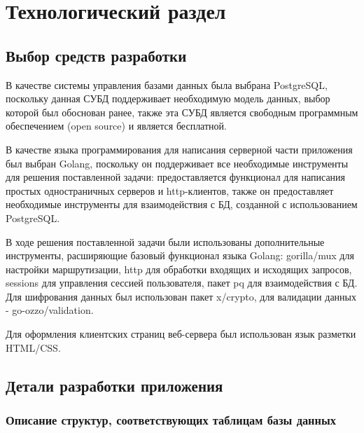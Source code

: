 \chapter{Технологический раздел}
\label{cha:impl}


\section{Выбор средств разработки}

В качестве системы управления базами данных была выбрана PostgreSQL\cite{postgres}, поскольку данная СУБД поддерживает необходимую модель данных, выбор которой был обоснован ранее, также эта СУБД является свободным программным обеспечением (open source) и является бесплатной.

В качестве языка программирования для написания серверной части приложения был выбран Golang\cite{golang}, поскольку он поддерживает все необходимые инструменты для решения поставленной задачи: предоставляется функционал для написания простых одностраничных серверов и http-клиентов, также он предоставляет необходимые инструменты для взаимодействия с БД, созданной с использованием PostgreSQL. 

В ходе решения поставленной задачи были использованы дополнительные инструменты, расширяющие базовый функционал языка Golang: gorilla/mux\cite{golang} для настройки маршрутизации, http\cite{http} для обработки входящих и исходящих запросов, sessions\cite{sessions} для управления сессией пользователя, пакет pq\cite{pq} для взаимодействия с БД. Для шифрования данных был использован пакет x/crypto\cite{crypto}, для валидации данных - go-ozzo/validation\cite{validation}.

Для оформления клиентских страниц веб-сервера был использован язык разметки HTML/CSS\cite{html}.

\clearpage

\section{Детали разработки приложения}

\subsection*{Описание структур, соответствующих таблицам базы данных}

